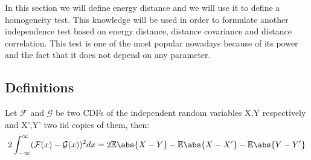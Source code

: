 
In this section we will define energy distance and we will use it to define a homogeneity test.
This knowledge will be used in order to formulate another independence test based on energy distance, distance covariance and distance correlation. This test is one of the most popular nowadays because of its power and the fact that it does not depend on any parameter.

\subsection{Definitions}

\begin{prop}
Let $\mathcal{F}$ and $\mathcal{G}$ be two CDFs of the independent random variables X,Y respectively and  X',Y' two iid copies of them, then:
\vspace{5mm}
$$
2\int_{-\infty}^{\infty}(\mathcal{F}(x) - \mathcal{G}(x))^{2} dx = 2\mathbb{E}\abs{X-Y} - \mathbb{E}\abs{X-X'} -\mathbb{E}\abs{Y-Y'}  
$$
\end{prop}
